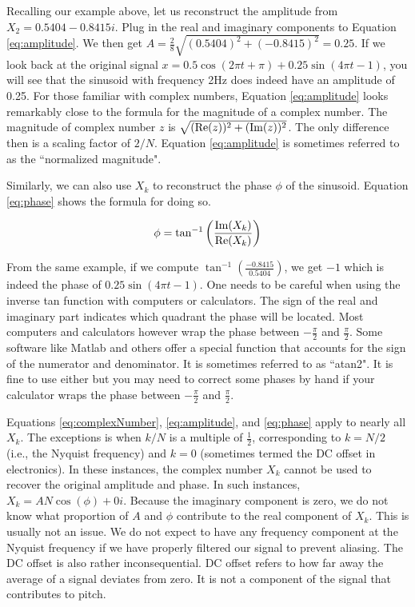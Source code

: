 Recalling our example above, let us reconstruct the amplitude from $X_2 = 0.5404 - 0.8415i$.  Plug in 
the real and imaginary components to Equation \ref{eq:amplitude}.  We then get 
$A = \frac{2}{8}\sqrt{(0.5404)^2 + (-0.8415)^2} = 0.25$.  If we look back at the original signal $x =
0.5\cos(2\pi t + \pi) + 0.25\sin(4\pi t - 1)$, you will see that the sinusoid with frequency 2Hz does indeed
have an amplitude of 0.25.  For those familiar with complex numbers, Equation \ref{eq:amplitude} looks 
remarkably close to the formula for the magnitude of a complex number.  The magnitude of complex number
$z$ is $\sqrt{(\mathrm{Re}(z))^2 + (\mathrm{Im}(z))^2}$.  The only difference then is a scaling factor of $2/N$.  Equation \ref{eq:amplitude}
is sometimes referred to as the ``normalized magnitude".

Similarly, we can also use $X_k$ to reconstruct the phase $\phi$ of the sinusoid.  Equation \ref{eq:phase}
shows the formula for doing so.

\begin{equation}
\label{eq:phase}
\phi = \tan^{-1}\bigg(\frac{\mathrm{Im}{(X_k)}}{\mathrm{Re}{(X_k)}}\bigg)
\end{equation}

\noindent From the same example, if we compute $\tan^{-1}(\frac{-0.8415}{0.5404})$, we get $-1$ which is indeed the
phase of $0.25\sin(4\pi t - 1)$.  One needs to be careful when using the inverse tan function with computers
or calculators.  The sign of the real and imaginary part indicates which quadrant the phase will be located.  Most
computers and calculators however wrap the phase between $-\frac{\pi}{2}$ and $\frac{\pi}{2}$.  Some software
like Matlab and others offer a special function that accounts for the sign of the numerator and denominator.  It is sometimes referred to as ``atan2".  It is fine to use either but you may need to correct some phases by 
hand if your calculator wraps the phase between $-\frac{\pi}{2}$ and $\frac{\pi}{2}$.

Equations \ref{eq:complexNumber}, \ref{eq:amplitude}, and \ref{eq:phase} apply to nearly all $X_k$. 
The exceptions is when $k/N$
is a multiple of $\frac{1}{2}$, corresponding to $k = N/2$ (i.e., the Nyquist frequency) and $k = 0$ 
(sometimes termed the DC offset in electronics).  In these 
instances, the complex number $X_k$ cannot be used to recover the original amplitude and phase.  In such instances,
$X_k = AN\cos{(\phi)} + 0i$.  Because the imaginary component is zero, we do not know
what proportion of $A$ and $\phi$ contribute to the real component of $X_k$.  
This is usually not an issue.  We do not expect to have
any frequency component at the Nyquist frequency if we have properly filtered our signal to prevent aliasing.
The DC offset is also rather inconsequential.  DC offset refers to how far away the average of a signal
deviates from zero.  It is not a component of the signal that contributes to pitch.  

